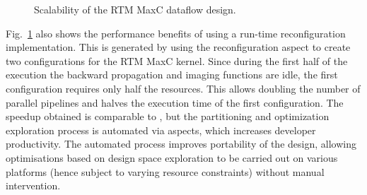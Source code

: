 \begin{figure}[!h]
  \centering
  \caption{Scalability of the RTM MaxC dataflow design.}
  \label{fig:scalability}
\end{figure}

Fig.~\ref{fig:scalability} also shows the performance benefits of
using a run-time reconfiguration implementation. This is generated by
using the reconfiguration aspect to create two configurations for the
RTM MaxC kernel. Since during the first half of the execution the
backward propagation and imaging functions are idle, the first
configuration requires only half the resources. This allows doubling
the number of parallel pipelines and halves the execution time of the
first configuration. The speedup obtained is comparable to
\cite{Xinyu:Qiwei:Luk:Qiang:Pell:2012}, but the partitioning and
optimization exploration process is automated via aspects, which
increases developer productivity. The automated process improves
portability of the design, allowing optimisations based on design
space exploration to be carried out on various platforms (hence
subject to varying resource constraints) without manual intervention.
